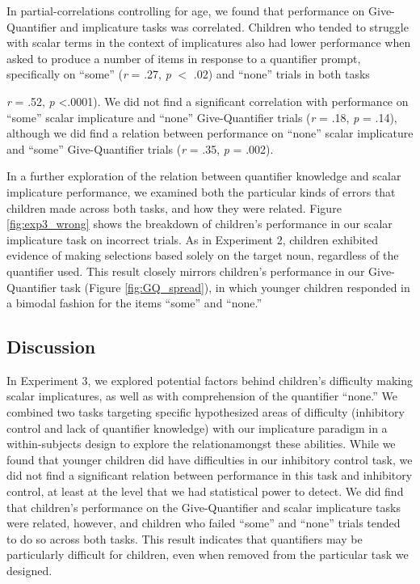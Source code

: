 \documentclass[man]{apa2}
\begin{document}
In partial-correlations controlling for age, we found that performance on Give-Quantifier and implicature tasks was correlated. Children who tended to struggle with scalar terms in the context of implicatures also had lower performance when asked to produce a number of items in response to a quantifier prompt, specifically on ``some''  (\textit{r} = .27, \textit{p} $<$ .02) and ``none'' trials in both tasks {\textit{r} = .52, \textit{p} \textless .0001). We did not find a significant correlation with performance on ``some'' scalar implicature and ``none'' Give-Quantifier trials (\textit{r} = .18, \textit{p} = .14), although we did find a relation between performance on ``none'' scalar implicature and ``some'' Give-Quantifier trials (\textit{r} = .35, \textit{p} = .002).

In a further exploration of the relation between quantifier knowledge and scalar implicature performance, we examined both the particular kinds of errors that children made across both tasks, and how they were related. Figure \ref{fig:exp3_wrong} shows the breakdown of children's performance in our scalar implicature task on incorrect trials. As in Experiment 2, children exhibited evidence of making selections based solely on the target noun, regardless of the quantifier used. This result closely mirrors children's performance in our Give-Quantifier task (Figure \ref{fig:GQ_spread}), in which younger children responded in a bimodal fashion for the items ``some'' and ``none.''


\subsection{Discussion}

In Experiment 3, we explored potential factors behind children's difficulty making scalar implicatures, as well as with comprehension of the quantifier ``none.'' We combined two tasks targeting specific hypothesized areas of difficulty (inhibitory control and lack of quantifier knowledge) with our implicature paradigm in a within-subjects design to explore the relationamongst these abilities. While we found that younger children did have difficulties in our inhibitory control task, we did not find a significant relation between performance in this task and inhibitory control, at least at the level that we had statistical power to detect. We did find that children's performance on the Give-Quantifier and scalar implicature tasks were related, however, and children who failed ``some'' and ``none'' trials tended to do so across both tasks. This result indicates that quantifiers may be particularly difficult for children, even when removed from the particular task we designed.

}
\end{document}
